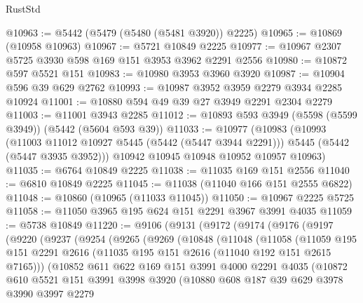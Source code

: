 \begin{lexlean}{RustStd}
\begin{coremodule}
@10963 := @5442 (@5479 (@5480 (@5481 @3920)) @2225)
@10965 := @10869 (@10958 @10963)
@10967 := @5721 @10849 @2225
@10977 := @10967 @2307 @5725 @3930 @598 @169 @151 @3953 @3962 @2291 @2556
@10980 := @10872 @597 @5521 @151
@10983 := @10980 @3953 @3960 @3920
@10987 := @10904 @596 @39 @629 @2762
@10993 := @10987 @3952 @3959 @2279 @3934 @2285 @10924
@11001 := @10880 @594 @49 @39 @27 @3949 @2291 @2304 @2279
@11003 := @11001 @3943 @2285
@11012 := @10893 @593 @3949 (@5598 (@5599 @3949)) (@5442 (@5604 @593 @39))
@11033 := @10977
    (@10983
      (@10993
        (@11003 @11012 @10927 @5445 (@5442 (@5447 @3944 @2291)))
        @5445
        (@5442 (@5447 @3935 @3952)))
      @10942
      @10945
      @10948
      @10952
      @10957
      @10963)
@11035 := @6764 @10849 @2225
@11038 := @11035 @169 @151 @2556
@11040 := @6810 @10849 @2225
@11045 := @11038 (@11040 @166 @151 @2555 @6822)
@11048 := @10860 (@10965 (@11033 @11045))
@11050 := @10967 @2225 @5725
@11058 := @11050 @3965 @195 @624 @151 @2291 @3967 @3991 @4035
@11059 := @5738 @10849
@11220 := @9106
    (@9131
      (@9172
        (@9174
          (@9176
            (@9197
              (@9220
                (@9237
                  (@9254
                    (@9265
                      (@9269
                        (@10848
                          (@11048
                            (@11058
                              (@11059
                                @195
                                @151
                                @2291
                                @2616
                                (@11035 @195 @151 @2616 (@11040 @192 @151 @2615 @7165)))
                              (@10852
                                @611
                                @622
                                @169
                                @151
                                @3991
                                @4000
                                @2291
                                @4035
                                (@10872
                                  @610
                                  @5521
                                  @151
                                  @3991
                                  @3998
                                  @3920
                                  (@10880
                                    @608
                                    @187
                                    @39
                                    @629
                                    @3978
                                    @3990
                                    @3997
                                    @2279

\end{coremodule}
\end{lexlean}
